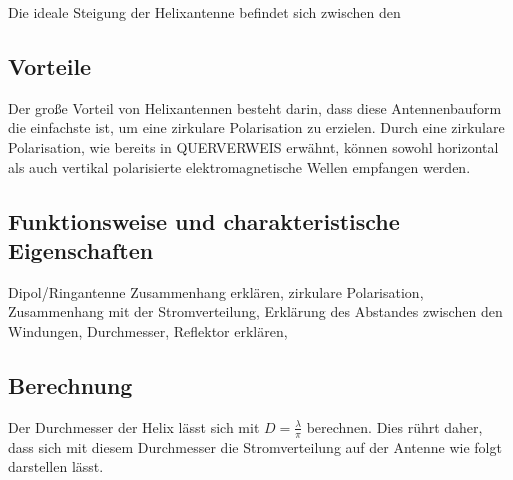 Die ideale Steigung der Helixantenne befindet sich zwischen den 

\subsection{Vorteile}
Der große Vorteil von Helixantennen besteht darin, dass diese Antennenbauform die einfachste ist, um eine zirkulare Polarisation zu erzielen. Durch eine zirkulare Polarisation, wie bereits in QUERVERWEIS erwähnt, können sowohl horizontal als auch vertikal polarisierte elektromagnetische Wellen empfangen werden.

\subsection{Funktionsweise und charakteristische Eigenschaften}
Dipol/Ringantenne Zusammenhang erklären, zirkulare Polarisation, Zusammenhang mit der Stromverteilung, Erklärung des Abstandes zwischen den Windungen, Durchmesser, Reflektor erklären,

\subsection{Berechnung}
Der Durchmesser der Helix lässt sich mit $D=\frac{\lambda}{\pi}$ berechnen. Dies rührt daher, dass sich mit diesem Durchmesser die Stromverteilung auf der Antenne wie folgt darstellen lässt.